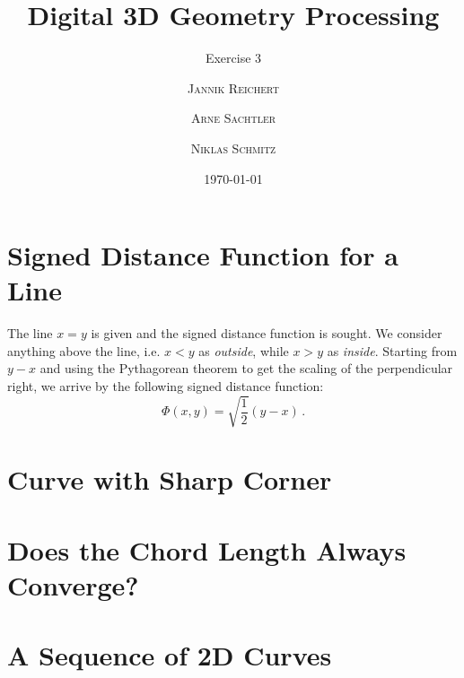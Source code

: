 \documentclass{scrartcl}
\title{Digital 3D Geometry Processing}
\subtitle{Exercise 3}
\author{\textsc{Jannik Reichert} \and \textsc{Arne Sachtler} \and \textsc{Niklas Schmitz}}
\date{\today}
\begin{document}
\maketitle

\section{Signed Distance Function for a Line}
The line $x = y$ is given and the signed distance function is sought.
We consider anything above the line, i.e. $x < y$ as \emph{outside},
while $x > y$ as \emph{inside}. Starting from $y - x$ and using the Pythagorean theorem
to get the scaling of the perpendicular right, we arrive by the following signed distance function:
\begin{equation}
	\Phi (x,y) = \sqrt{\frac{1}{2}} (y - x) \, .
\end{equation}

\section{Curve with Sharp Corner}

\section{Does the Chord Length Always Converge?}

\section{A Sequence of 2D Curves}

	
\end{document}
